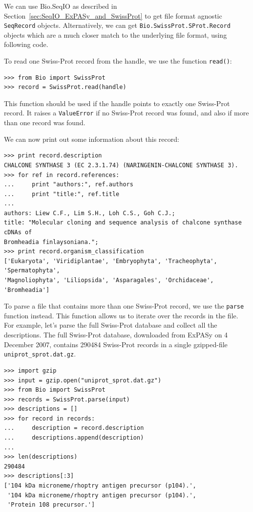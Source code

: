 \documentclass{report}
\begin{document}
We can use Bio.SeqIO as described in Section~\ref{sec:SeqIO_ExPASy_and_SwissProt} to get file format agnostic \verb|SeqRecord| objects.  Alternatively, we can get \verb|Bio.SwissProt.SProt.Record| objects which are a much closer match to the underlying file format, using following code.

To read one Swiss-Prot record from the handle, we use the function \verb|read()|:
\begin{verbatim}
>>> from Bio import SwissProt
>>> record = SwissProt.read(handle)
\end{verbatim}
This function should be used if the handle points to exactly one Swiss-Prot record. It raises a \verb|ValueError| if no Swiss-Prot record was found, and also if more than one record was found.

We can now print out some information about this record:
\begin{verbatim}
>>> print record.description
CHALCONE SYNTHASE 3 (EC 2.3.1.74) (NARINGENIN-CHALCONE SYNTHASE 3).
>>> for ref in record.references:
...     print "authors:", ref.authors
...     print "title:", ref.title
...
authors: Liew C.F., Lim S.H., Loh C.S., Goh C.J.;
title: "Molecular cloning and sequence analysis of chalcone synthase cDNAs of
Bromheadia finlaysoniana.";
>>> print record.organism_classification
['Eukaryota', 'Viridiplantae', 'Embryophyta', 'Tracheophyta', 'Spermatophyta',
'Magnoliophyta', 'Liliopsida', 'Asparagales', 'Orchidaceae', 'Bromheadia']
\end{verbatim}

To parse a file that contains more than one Swiss-Prot record, we use the \verb|parse| function instead. This function allows us to iterate over the records in the file. For example, let's parse the full Swiss-Prot database and collect all the descriptions. The full Swiss-Prot database, downloaded from ExPASy on 4 December 2007, contains 290484 Swiss-Prot records in a single gzipped-file \verb|uniprot_sprot.dat.gz|.

\begin{verbatim}
>>> import gzip
>>> input = gzip.open("uniprot_sprot.dat.gz")
>>> from Bio import SwissProt
>>> records = SwissProt.parse(input)
>>> descriptions = []
>>> for record in records:
...     description = record.description
...     descriptions.append(description)
...
>>> len(descriptions)
290484
>>> descriptions[:3]
['104 kDa microneme/rhoptry antigen precursor (p104).',
 '104 kDa microneme/rhoptry antigen precursor (p104).',
 'Protein 108 precursor.']
\end{verbatim}
\end{document}

